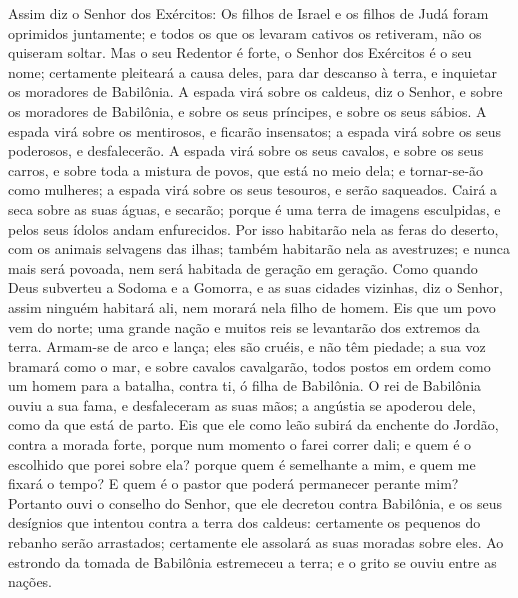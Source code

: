 Assim diz o Senhor dos Exércitos: Os filhos de Israel e os filhos
de Judá foram oprimidos juntamente; e todos os que os levaram
cativos os retiveram, não os quiseram soltar. Mas o seu
Redentor é forte, o Senhor dos Exércitos é o seu nome; certamente
pleiteará a causa deles, para dar descanso à terra, e inquietar os
moradores de Babilônia. A espada virá sobre os caldeus, diz o
Senhor, e sobre os moradores de Babilônia, e sobre os seus
príncipes, e sobre os seus sábios. A espada virá sobre os
mentirosos, e ficarão insensatos; a espada virá sobre os seus
poderosos, e desfalecerão. A espada virá sobre os seus
cavalos, e sobre os seus carros, e sobre toda a mistura de povos,
que está no meio dela; e tornar-se-ão como mulheres; a espada virá
sobre os seus tesouros, e serão saqueados. Cairá a seca sobre
as suas águas, e secarão; porque é uma terra de imagens esculpidas,
e pelos seus ídolos andam enfurecidos. Por isso habitarão
nela as feras do deserto, com os animais selvagens das ilhas; também
habitarão nela as avestruzes; e nunca mais será povoada, nem será
habitada de geração em geração. Como quando Deus subverteu a
Sodoma e a Gomorra, e as suas cidades vizinhas, diz o Senhor, assim
ninguém habitará ali, nem morará nela filho de homem. Eis que
um povo vem do norte; uma grande nação e muitos reis se levantarão
dos extremos da terra. Armam-se de arco e lança; eles são
cruéis, e não têm piedade; a sua voz bramará como o mar, e sobre
cavalos cavalgarão, todos postos em ordem como um homem para a
batalha, contra ti, ó filha de Babilônia. O rei de Babilônia
ouviu a sua fama, e desfaleceram as suas mãos; a angústia se
apoderou dele, como da que está de parto. Eis que ele como
leão subirá da enchente do Jordão, contra a morada forte, porque num
momento o farei correr dali; e quem é o escolhido que porei sobre
ela? porque quem é semelhante a mim, e quem me fixará o tempo? E
quem é o pastor que poderá permanecer perante mim? Portanto
ouvi o conselho do Senhor, que ele decretou contra Babilônia, e os
seus desígnios que intentou contra a terra dos caldeus: certamente
os pequenos do rebanho serão arrastados; certamente ele assolará as
suas moradas sobre eles. Ao estrondo da tomada de Babilônia
estremeceu a terra; e o grito se ouviu entre as nações.

\medskip

